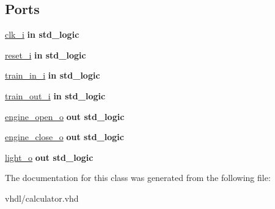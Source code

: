 \subsection*{Ports}
 \begin{DoxyCompactItemize}
\item 
\mbox{\label{classtrain__crossing_abe949478e3f8aad0a6aeb1842fa6c608}} 
\hyperlink{classtrain__crossing_abe949478e3f8aad0a6aeb1842fa6c608}{clk\+\_\+i}  {\bfseries {\bfseries \textcolor{vhdlchar}{in}\textcolor{vhdlchar}{ }}} {\bfseries \textcolor{vhdlchar}{std\+\_\+logic}\textcolor{vhdlchar}{ }} 
\item 
\mbox{\label{classtrain__crossing_a55da7e76960757f8c6842e86a28ee7be}} 
\hyperlink{classtrain__crossing_a55da7e76960757f8c6842e86a28ee7be}{reset\+\_\+i}  {\bfseries {\bfseries \textcolor{vhdlchar}{in}\textcolor{vhdlchar}{ }}} {\bfseries \textcolor{vhdlchar}{std\+\_\+logic}\textcolor{vhdlchar}{ }} 
\item 
\mbox{\label{classtrain__crossing_a89ddc05724fd8e2328f219a852780ff4}} 
\hyperlink{classtrain__crossing_a89ddc05724fd8e2328f219a852780ff4}{train\+\_\+in\+\_\+i}  {\bfseries {\bfseries \textcolor{vhdlchar}{in}\textcolor{vhdlchar}{ }}} {\bfseries \textcolor{vhdlchar}{std\+\_\+logic}\textcolor{vhdlchar}{ }} 
\item 
\mbox{\label{classtrain__crossing_aa21cf225190a0466947bd0586e1f0c9d}} 
\hyperlink{classtrain__crossing_aa21cf225190a0466947bd0586e1f0c9d}{train\+\_\+out\+\_\+i}  {\bfseries {\bfseries \textcolor{vhdlchar}{in}\textcolor{vhdlchar}{ }}} {\bfseries \textcolor{vhdlchar}{std\+\_\+logic}\textcolor{vhdlchar}{ }} 
\item 
\mbox{\label{classtrain__crossing_ada68dc32429a6432f4da2a3748700feb}} 
\hyperlink{classtrain__crossing_ada68dc32429a6432f4da2a3748700feb}{engine\+\_\+open\+\_\+o}  {\bfseries {\bfseries \textcolor{vhdlchar}{out}\textcolor{vhdlchar}{ }}} {\bfseries \textcolor{vhdlchar}{std\+\_\+logic}\textcolor{vhdlchar}{ }} 
\item 
\mbox{\label{classtrain__crossing_abe721277c98338b08484ce49a5567882}} 
\hyperlink{classtrain__crossing_abe721277c98338b08484ce49a5567882}{engine\+\_\+close\+\_\+o}  {\bfseries {\bfseries \textcolor{vhdlchar}{out}\textcolor{vhdlchar}{ }}} {\bfseries \textcolor{vhdlchar}{std\+\_\+logic}\textcolor{vhdlchar}{ }} 
\item 
\mbox{\label{classtrain__crossing_abbc7e4437e2e4370e7b19b608280a66e}} 
\hyperlink{classtrain__crossing_abbc7e4437e2e4370e7b19b608280a66e}{light\+\_\+o}  {\bfseries {\bfseries \textcolor{vhdlchar}{out}\textcolor{vhdlchar}{ }}} {\bfseries \textcolor{vhdlchar}{std\+\_\+logic}\textcolor{vhdlchar}{ }} 
\end{DoxyCompactItemize}


The documentation for this class was generated from the following file\+:\begin{DoxyCompactItemize}
\item 
vhdl/calculator.\+vhd\end{DoxyCompactItemize}
